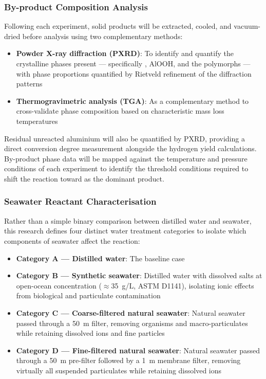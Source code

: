 \documentclass[12pt]{article}
\begin{document}
\subsubsection*{By-product Composition Analysis}

Following each experiment, solid products will be extracted, cooled, and 
vacuum-dried before analysis using two complementary methods:

\begin{itemize}
    \item \textbf{Powder X-ray diffraction (PXRD)}: To identify and quantify the 
    crystalline phases present --- specifically , AlOOH, and the 
     polymorphs --- with phase proportions quantified by Rietveld 
    refinement of the diffraction patterns

    \item \textbf{Thermogravimetric analysis (TGA)}: As a complementary method to 
    cross-validate phase composition based on characteristic mass loss temperatures
\end{itemize}

Residual unreacted aluminium will also be quantified by PXRD, providing a direct 
conversion degree measurement alongside the hydrogen yield calculations. By-product 
phase data will be mapped against the temperature and pressure conditions of each 
experiment to identify the threshold conditions required to shift the reaction 
toward  as the dominant product.

\subsubsection*{Seawater Reactant Characterisation}

Rather than a simple binary comparison between distilled water and seawater, this 
research defines four distinct water treatment categories to isolate which components 
of seawater affect the reaction:

\begin{itemize}
    \item \textbf{Category A --- Distilled water}: The baseline case

    \item \textbf{Category B --- Synthetic seawater}: Distilled water with dissolved 
    salts at open-ocean concentration (${\approx}$35~g/L, ASTM D1141), isolating 
    ionic effects from biological and particulate contamination

    \item \textbf{Category C --- Coarse-filtered natural seawater}: Natural seawater 
    passed through a 50~\textmu m filter, removing organisms and macro-particulates 
    while retaining dissolved ions and fine particles

    \item \textbf{Category D --- Fine-filtered natural seawater}: Natural seawater 
    passed through a 50~\textmu m pre-filter followed by a 1~\textmu m membrane 
    filter, removing virtually all suspended particulates while retaining dissolved 
    ions
\end{itemize}
\end{document}
